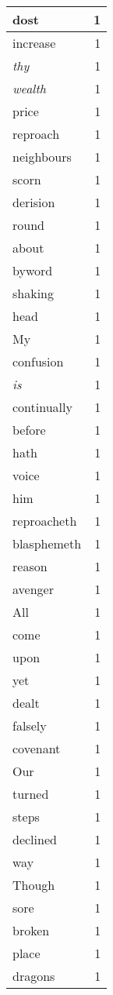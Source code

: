 \begin{center}
\begin{longtable}{l|r}
dost & 1 \\ \hline
increase & 1 \\ \hline
\emph{thy} & 1 \\ \hline
\emph{wealth} & 1 \\ \hline
price & 1 \\ \hline
reproach & 1 \\ \hline
neighbours & 1 \\ \hline
scorn & 1 \\ \hline
derision & 1 \\ \hline
round & 1 \\ \hline
about & 1 \\ \hline
byword & 1 \\ \hline
shaking & 1 \\ \hline
head & 1 \\ \hline
My & 1 \\ \hline
confusion & 1 \\ \hline
\emph{is} & 1 \\ \hline
continually & 1 \\ \hline
before & 1 \\ \hline
hath & 1 \\ \hline
voice & 1 \\ \hline
him & 1 \\ \hline
reproacheth & 1 \\ \hline
blasphemeth & 1 \\ \hline
reason & 1 \\ \hline
avenger & 1 \\ \hline
All & 1 \\ \hline
come & 1 \\ \hline
upon & 1 \\ \hline
yet & 1 \\ \hline
dealt & 1 \\ \hline
falsely & 1 \\ \hline
covenant & 1 \\ \hline
Our & 1 \\ \hline
turned & 1 \\ \hline
steps & 1 \\ \hline
declined & 1 \\ \hline
way & 1 \\ \hline
Though & 1 \\ \hline
sore & 1 \\ \hline
broken & 1 \\ \hline
place & 1 \\ \hline
dragons & 1 \\ \hline

\end{longtable}
\end{center}
